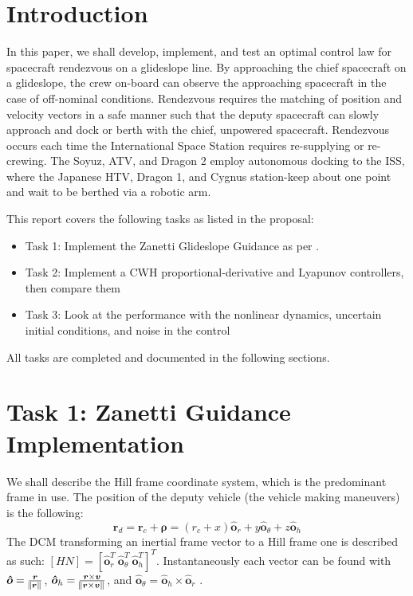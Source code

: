\documentclass[conf]{new-aiaa}
\begin{document}
\begin{singlespace}
\clearpage
\section{Introduction}
In this paper, we shall develop, implement, and test an optimal control law for spacecraft rendezvous on a glideslope line. By approaching the chief spacecraft on a glideslope, the crew on-board can observe the approaching spacecraft in the case of off-nominal conditions. Rendezvous requires the matching of position and velocity vectors in a safe manner such that the deputy spacecraft can slowly approach and dock or berth with the chief, unpowered spacecraft. Rendezvous occurs each time the International Space Station requires re-supplying or re-crewing. The Soyuz, ATV, and Dragon 2 employ autonomous docking to the ISS, where the Japanese HTV, Dragon 1, and Cygnus station-keep about one point and wait to be berthed via a robotic arm.

This report covers the following tasks as listed in the proposal:
\begin{itemize}
    \item Task 1: Implement the Zanetti Glideslope Guidance as per \cite{zanetti2011optimal}.
    \item Task 2: Implement a CWH proportional-derivative and Lyapunov controllers, then compare them
    \item Task 3: Look at the performance with the nonlinear dynamics, uncertain initial conditions, and noise in the control
\end{itemize}
All tasks are completed and documented in the following sections.
%
\section{Task 1: Zanetti Guidance Implementation}
We shall describe the Hill frame coordinate system, which is the predominant frame in use. The position of the deputy vehicle (the vehicle making maneuvers) is the following:
\begin{equation}\label{relativedefinition}
    \bm{r}_d = \bm{r}_c + \bm{\rho} = (r_c + x)\bm{\hat{o}}_r + y\bm{\hat{o}}_\theta + z \bm{\hat{o}}_h
\end{equation}
The DCM transforming an inertial frame vector to a Hill frame one is described as such: $[HN] = [\bm{\hat{o}}_r^T \ \bm{\hat{o}}_\theta^T \ \bm{\hat{o}}_h^T]^T$. Instantaneously each vector can be found with $\bm{\hat{o}} = \frac{\bm{r}}{\norm{\bm{r}}}$, $\bm{\hat{o}}_h = \frac{\bm{r}\times\bm{v}}{\norm{\bm{r}\times\bm{v}}}$, and $\bm{\hat{o}}_\theta = \bm{\hat{o}}_h \times \bm{\hat{o}}_r$ \cite{sj}.


\end{singlespace}
\end{document}
